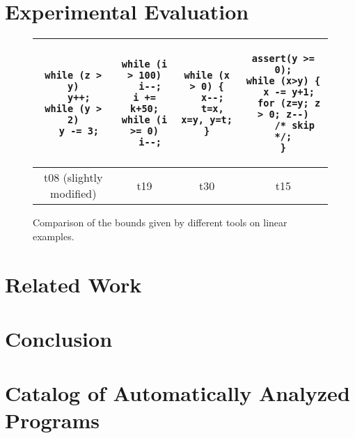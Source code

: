\documentclass[nocopyrightspace,preprint]{sigplanconf}
\begin{document}



\section{Experimental Evaluation}

\begin{figure*}
\centering
\begin{tabular}{c|c|c|c}
%
\begin{lstlisting}
while (z > y)
  y++;
while (y > 2)
  y -= 3;
\end{lstlisting}
&
\begin{lstlisting}
while (i > 100)
  i--;
i += k+50;
while (i >= 0)
  i--;
\end{lstlisting}
&
\begin{lstlisting}
while (x > 0) {
  x--;
  t=x, x=y, y=t;
}
\end{lstlisting}
&
\begin{lstlisting}
assert(y >= 0);
while (x>y) {
  x -= y+1;
  for (z=y; z > 0; z--)
    /* skip */;
}
\end{lstlisting}
\\
%
\hline
t08 (slightly modified) & t19 & t30 & t15
%
\end{tabular}
\caption{
  Comparison of the bounds given by different tools on
  linear examples.
}
\label{fig:compar}
\end{figure*}

\section{Related Work}

\section{Conclusion}




\clearpage
\appendix

\section{Catalog of Automatically Analyzed Programs}
\label{app:cat}
\end{document}
